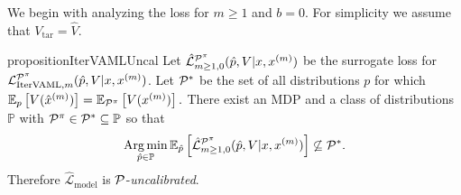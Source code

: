 We begin with analyzing the loss for $m\geq1$ and $b=0$.
For simplicity we assume that $V_\mathrm{tar} = \hat{V}$.
%
\begin{restatable}{proposition}{IterVAMLUncal}\label{prop:cvaml:2_1}
    Let $\hat{\mathcal{L}}^{\P^\pi}_{m\geq1,0}(\hat{p},V|x,x^{(m)})$ be the surrogate loss for $\mathcal{L}_{\mathrm{IterVAML}, m}^{\P^\pi}(\hat{p}, V|x, x^{(m)})$.
    Let $\P^*$ be the set of all distributions $p$ for which $\EEX{p}{V(\hat{x}^{(m)})} = \EEX{\P^\pi}{V(x^{(m)})}.$
    There exist an MDP and a class of distributions $\mathbb{P}$ with $\P^\pi \in \P^* \subseteq \mathbb{P}$ so that $$\Argmin_{\hat{p} \in \mathbb{P}} \mathbb{E}_{\hat{p}}\left[\hat{\mathcal{L}}^{\P^\pi}_{m\geq1,0}(\hat{p},V|x,x^{(m)})\right] \not\subseteq \P^*.$$
    Therefore $\hat{\mathcal{L}}_\mathrm{model}$ is $\P$-\emph{uncalibrated}.
\end{restatable}
